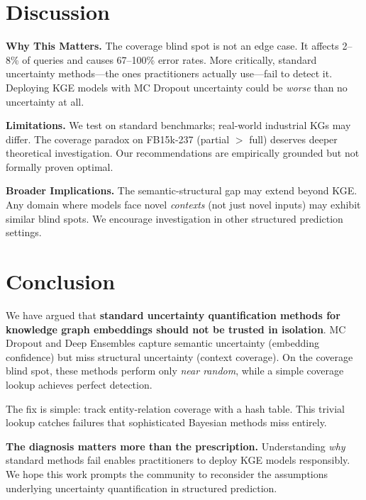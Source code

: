 \documentclass{article}
\begin{document}
\section{Discussion}

\textbf{Why This Matters.} The coverage blind spot is not an edge case. It affects 2--8\% of queries and causes 67--100\% error rates. More critically, standard uncertainty methods---the ones practitioners actually use---fail to detect it. Deploying KGE models with MC Dropout uncertainty could be \emph{worse} than no uncertainty at all.

\textbf{Limitations.} We test on standard benchmarks; real-world industrial KGs may differ. The coverage paradox on FB15k-237 (partial $>$ full) deserves deeper theoretical investigation. Our recommendations are empirically grounded but not formally proven optimal.

\textbf{Broader Implications.} The semantic-structural gap may extend beyond KGE. Any domain where models face novel \emph{contexts} (not just novel inputs) may exhibit similar blind spots. We encourage investigation in other structured prediction settings.

\section{Conclusion}

We have argued that \textbf{standard uncertainty quantification methods for knowledge graph embeddings should not be trusted in isolation}. MC Dropout and Deep Ensembles capture semantic uncertainty (embedding confidence) but miss structural uncertainty (context coverage). On the coverage blind spot, these methods perform only \emph{near random}, while a simple coverage lookup achieves perfect detection.

The fix is simple: track entity-relation coverage with a hash table. This trivial lookup catches failures that sophisticated Bayesian methods miss entirely.

\textbf{The diagnosis matters more than the prescription.} Understanding \emph{why} standard methods fail enables practitioners to deploy KGE models responsibly. We hope this work prompts the community to reconsider the assumptions underlying uncertainty quantification in structured prediction.
\end{document}
